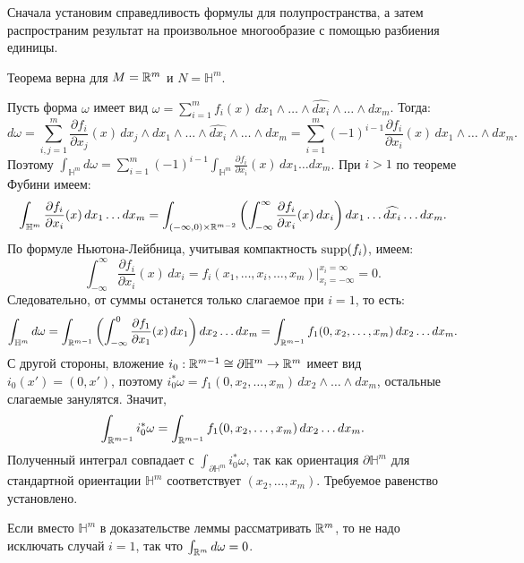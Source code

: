 \begin{myproof}
	Сначала установим справедливость формулы для полупространства, а затем распространим результат на произвольное многообразие с помощью разбиения единицы.
\begin{lemma}
    Теорема верна для $M = \mathbb{R}^m$ и $N = \mathbb{H}^m$.
\end{lemma}

\begin{prooflemma}
    Пусть форма $\omega$ имеет вид $\omega = \sum_{i=1}^m f_i(x)\, dx_1 \wedge \dotsc \wedge \widehat{dx_i} \wedge \dotsc \wedge dx_m$. Тогда:
    \[
    d\omega = \sum_{i,j=1}^m \frac{\partial f_i}{\partial x_j}(x)\, dx_j \wedge dx_1 \wedge \dotsc \wedge \widehat{dx_i} \wedge \dotsc \wedge dx_m = \sum_{i=1}^m (-1)^{i-1} \frac{\partial f_i}{\partial x_i}(x)\, dx_1 \wedge \dotsc \wedge dx_m.
    \]
    Поэтому $\int_{\mathbb{H}^m} d\omega = \sum_{i=1}^m (-1)^{i-1} \int_{\mathbb{H}^m} \frac{\partial f_i}{\partial x_i}(x)\, dx_1 \dots dx_m$.
    При $i > 1$ по теореме Фубини имеем:
    \[
    \int_{\mathbb{H}^m} \frac{\partial f_i}{\partial x_i}(x)\, dx_1 \dots dx_m = \int_{(-\infty, 0) \times \mathbb{R}^{m-2}} \left( \int_{-\infty}^\infty \frac{\partial f_i}{\partial x_i}(x)\, dx_i \right) dx_1 \dots \widehat{dx_i} \dots dx_m.
    \]
    По формуле Ньютона-Лейбница, учитывая компактность $\operatorname{supp}(f_i)$, имеем:
    \[
    \int_{-\infty}^\infty \frac{\partial f_i}{\partial x_i}(x)\, dx_i = f_i(x_1, \dots, x_i, \dots, x_m) \Big|_{x_i=-\infty}^{x_i=\infty} = 0.
    \]
    Следовательно, от суммы останется только слагаемое при $i=1$, то есть:
    \[
    \int_{\mathbb{H}^m} d\omega = \int_{\mathbb{R}^{m-1}} \left( \int_{-\infty}^0 \frac{\partial f_1}{\partial x_1}(x)\, dx_1 \right) dx_2 \dots dx_m = \int_{\mathbb{R}^{m-1}} f_1(0, x_2, \dots, x_m)\, dx_2 \dots dx_m.
    \]
	С другой стороны, вложение $i_0 : \mathbb{R}^{m-1} \cong \partial \mathbb{H}^m \to \mathbb{R}^m$ имеет вид $i_0(x') = (0, x')$,
	поэтому $i_0^*\omega = f_1(0, x_2, \dots, x_m)\, dx_2 \wedge \dotsc \wedge dx_m$, остальные слагаемые занулятся. Значит,
    \[
    \int_{\mathbb{R}^{m-1}} i_0^*\omega = \int_{\mathbb{R}^{m-1}} f_1(0, x_2, \dots, x_m)\, dx_2 \dots dx_m.
    \]
    Полученный интеграл совпадает с $\int_{\partial \mathbb{H}^m} i_0^* \omega$, так как ориентация $\partial \mathbb{H}^m$ для стандартной ориентации $\mathbb{H}^m$ соответствует $(x_2, \dots, x_m)$. Требуемое равенство установлено.
\end{prooflemma}

\begin{note}
    Если вместо $\mathbb{H}^m$ в доказательстве леммы рассматривать $\mathbb{R}^m$, то не надо исключать случай $i=1$, так что $\int_{\mathbb{R}^m} d\omega = 0$.
\end{note}


\end{myproof}
